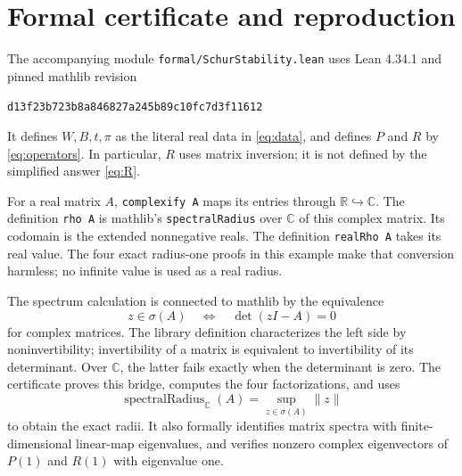 \documentclass[11pt]{article}
\newcommand{\R}{\mathbb R}
\newcommand{\C}{\mathbb C}
\begin{document}
\section{Formal certificate and reproduction}
The accompanying module \nolinkurl{formal/SchurStability.lean} uses Lean 4.34.1
and pinned mathlib revision
\begin{center}\small\nolinkurl{d13f23b723b8a846827a245b89c10fc7d3f11612}\end{center}
It defines $W,B,t,\pi$ as the literal real data in \eqref{eq:data}, and defines
$P$ and $R$ by \eqref{eq:operators}. In particular, $R$ uses matrix inversion;
it is not defined by the simplified answer \eqref{eq:R}.

For a real matrix $A$, \texttt{complexify A} maps its entries through
$\R\hookrightarrow\C$. The definition \texttt{rho A} is mathlib's
\nolinkurl{spectralRadius} over $\C$ of this complex matrix. Its codomain is
the extended nonnegative reals. The definition \texttt{realRho A} takes
its real value. The four exact radius-one proofs in this example make
that conversion harmless; no infinite value is used as a real radius.

The spectrum calculation is connected to mathlib by the equivalence
\[
 z\in\sigma(A)\quad\Longleftrightarrow\quad \det(zI-A)=0
\]
for complex matrices. The library definition characterizes the left side
by noninvertibility; invertibility of a matrix is equivalent to
invertibility of its determinant. Over $\C$, the latter fails exactly when
the determinant is zero. The certificate proves this bridge, computes the
four factorizations, and uses
\[
 \operatorname{spectralRadius}_{\C}(A)
 =\sup_{z\in\sigma(A)}\|z\|
\]
to obtain the exact radii. It also formally identifies matrix spectra with
finite-dimensional linear-map eigenvalues, and verifies nonzero complex
eigenvectors of $P(1)$ and $R(1)$ with eigenvalue one.
\end{document}
